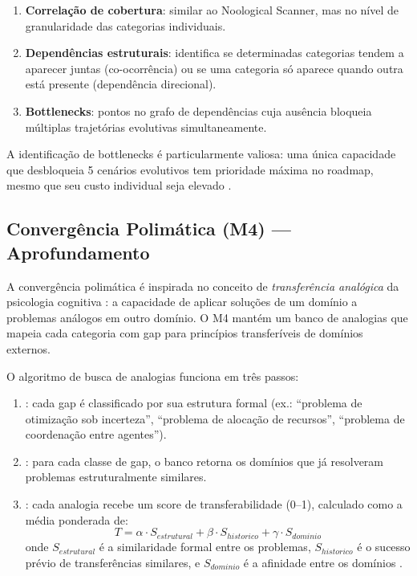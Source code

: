 \begin{enumerate}
\item \textbf{Correlação de cobertura}: similar ao Noological Scanner, mas
no nível de granularidade das categorias individuais.
\item \textbf{Dependências estruturais}: identifica se determinadas
categorias tendem a aparecer juntas (co-ocorrência) ou se uma categoria
só aparece quando outra está presente (dependência direcional).
\item \textbf{Bottlenecks}: pontos no grafo de dependências cuja ausência
bloqueia múltiplas trajetórias evolutivas simultaneamente.
\end{enumerate}

A identificação de bottlenecks é particularmente valiosa: uma única
capacidade que desbloqueia 5 cenários evolutivos tem prioridade máxima
no roadmap, mesmo que seu custo individual seja elevado
\cite{barabasi2016network}.

\subsection{Convergência Polimática (M4) --- Aprofundamento}

A convergência polimática é inspirada no conceito de \emph{transferência
analógica} da psicologia cognitiva \cite{anderson2001introduction}: a
capacidade de aplicar soluções de um domínio a problemas análogos em
outro domínio. O M4 mantém um banco de analogias que mapeia cada
categoria com gap para princípios transferíveis de domínios externos.

O algoritmo de busca de analogias funciona em três passos:

\begin{enumerate}
\item {}: cada gap é classificado por sua
estrutura formal (ex.: ``problema de otimização sob incerteza'', ``problema
de alocação de recursos'', ``problema de coordenação entre agentes'').
\item {}: para cada classe de gap,
o banco retorna os domínios que já resolveram problemas estruturalmente
similares.
\item {}: cada analogia recebe um
score de transferabilidade (0--1), calculado como a média ponderada de:
\begin{equation}
T = \alpha \cdot S_{estrutural} + \beta \cdot S_{historico} +
\gamma \cdot S_{dominio}
\end{equation}
onde $S_{estrutural}$ é a similaridade formal entre os problemas,
$S_{historico}$ é o sucesso prévio de transferências similares, e
$S_{dominio}$ é a afinidade entre os domínios \cite{laranjeira2026opencode}.
\end{enumerate}

